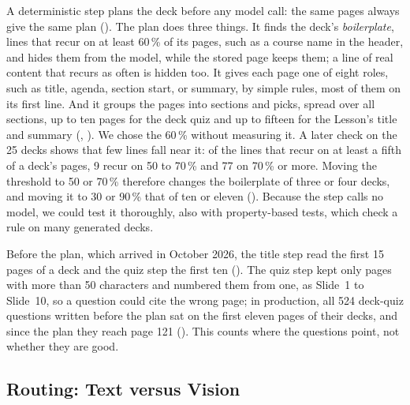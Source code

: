 A deterministic step plans the deck before any model call: the same pages
always give the same plan (). The plan does three
things. It finds the deck's \emph{boilerplate}, lines that recur on at least
60\,\% of its pages, such as a course name in the header, and hides them from
the model, while the stored page keeps them; a line of real content that
recurs as often is hidden too. It gives each page one of eight roles, such as
title, agenda, section start, or summary, by simple rules, most of them on its
first line.
And it groups the pages into sections and picks, spread over all sections, up
to ten pages for the deck quiz and up to fifteen for the Lesson's title and
summary (, ). We chose the
60\,\% without measuring it. A later check on the 25 decks shows that few
lines fall near it: of the lines that recur on at least a fifth of a deck's
pages, 9 recur on 50 to 70\,\% and 77 on 70\,\% or more. Moving the threshold
to 50 or 70\,\% therefore changes the boilerplate of three or four decks, and
moving it to 30 or 90\,\% that of ten or eleven
().
Because the step calls no model, we could test it thoroughly, also with
property-based tests, which check a rule on many generated decks.

Before the plan, which arrived in October 2026, the title step read the first
15 pages of a deck and the quiz step the first ten
(). The quiz step kept only pages with more than 50
characters and numbered them from one, as Slide~1 to Slide~10, so a question
could cite the wrong page; in
production, all 524 deck-quiz questions written before the plan sat on the
first eleven pages of their decks, and since the plan they reach page 121
().
This counts where the questions point, not whether they are good.

\subsection{Routing: Text versus Vision}
\label{sec:routing}

